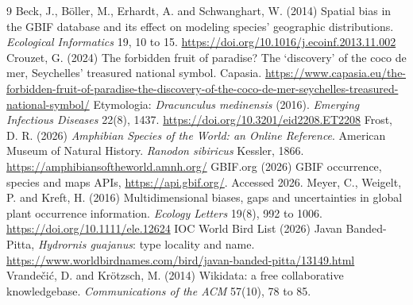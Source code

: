 \documentclass[11pt,a4paper]{article}
\begin{document}
\begin{thebibliography}{9}
 Beck, J., B\"oller, M., Erhardt, A. and Schwanghart, W. (2014) Spatial bias in the GBIF database and its effect on modeling species' geographic distributions. \textit{Ecological Informatics} 19, 10 to 15. \url{https://doi.org/10.1016/j.ecoinf.2013.11.002}
 Crouzet, G. (2024) The forbidden fruit of paradise? The `discovery' of the coco de mer, Seychelles' treasured national symbol. Capasia. \url{https://www.capasia.eu/the-forbidden-fruit-of-paradise-the-discovery-of-the-coco-de-mer-seychelles-treasured-national-symbol/}
 Etymologia: \textit{Dracunculus medinensis} (2016). \textit{Emerging Infectious Diseases} 22(8), 1437. \url{https://doi.org/10.3201/eid2208.ET2208}
 Frost, D. R. (2026) \textit{Amphibian Species of the World: an Online Reference}. American Museum of Natural History. \textit{Ranodon sibiricus} Kessler, 1866. \url{https://amphibiansoftheworld.amnh.org/}
 GBIF.org (2026) GBIF occurrence, species and maps APIs, \url{https://api.gbif.org/}. Accessed 2026.
 Meyer, C., Weigelt, P. and Kreft, H. (2016) Multidimensional biases, gaps and uncertainties in global plant occurrence information. \textit{Ecology Letters} 19(8), 992 to 1006. \url{https://doi.org/10.1111/ele.12624}
 IOC World Bird List (2026) Javan Banded-Pitta, \textit{Hydrornis guajanus}: type locality and name. \url{https://www.worldbirdnames.com/bird/javan-banded-pitta/13149.html}
 Vrande\v{c}i\'c, D. and Kr\"otzsch, M. (2014) Wikidata: a free collaborative knowledgebase. \textit{Communications of the ACM} 57(10), 78 to 85.
\end{thebibliography}
\end{document}
